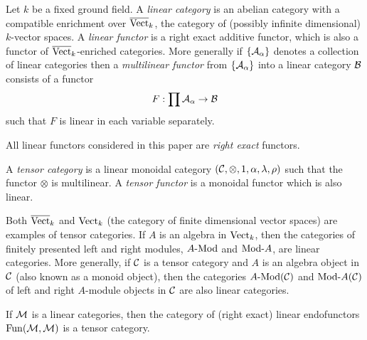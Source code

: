 \documentclass{amsart}
\begin{document}
	Let $k$ be a fixed ground field. A {\em linear category} is an abelian category with a compatible enrichment over $\overline{\mathrm{Vect}}_k$, the category of (possibly infinite dimensional) $k$-vector spaces. 
A {\em linear functor} is a right exact additive functor, which is also a functor of $\overline{\mathrm{Vect}}_k$-enriched categories. 
More generally if $\{\mathcal A_\alpha\}$ denotes a collection of linear categories then a {\em multilinear functor} from $\{\mathcal A_\alpha\}$ into a linear category $\mathcal B$ consists of a functor
\begin{equation*}
	F: \prod \mathcal A_\alpha \to \mathcal B
\end{equation*}
such that $F$ is linear in each variable separately. 

\begin{warning}
	All linear functors considered in this paper are {\em right exact} functors.
\end{warning}

\begin{definition}
	A {\em tensor category} is a linear monoidal category $(\mathcal C, \otimes, 1, \alpha, \lambda, \rho)$ such that the functor $\otimes$ is multilinear. A {\em tensor functor} is a monoidal functor which is also linear.
\end{definition}

\begin{example}
	Both $\overline{\mathrm{Vect}}_k$ and $\mathrm{Vect}_k$ (the category of finite dimensional vector spaces) are examples of tensor categories. If $A$ is an algebra in $\mathrm{Vect}_k$, then the categories of finitely presented left and right modules, $\Mod{A}{}$ and $\Mod{}{A}$, are linear categories. More generally, if $\mathcal C$ is a tensor category and $A$ is an algebra object in $\mathcal C$ (also known as a monoid object), then the categories $\Mod{A}{}(\cC)$ and $\Mod{}{A}(\cC)$ of left and right $A$-module objects in $\mathcal C$ are also linear categories.
\end{example}

\begin{example}
	If $\mathcal M$ is a linear categories, then the category of (right exact) linear endofunctors $\operatorname{Fun}(\mathcal M, \mathcal M)$ is a tensor category. 
\end{example}
\end{document}
